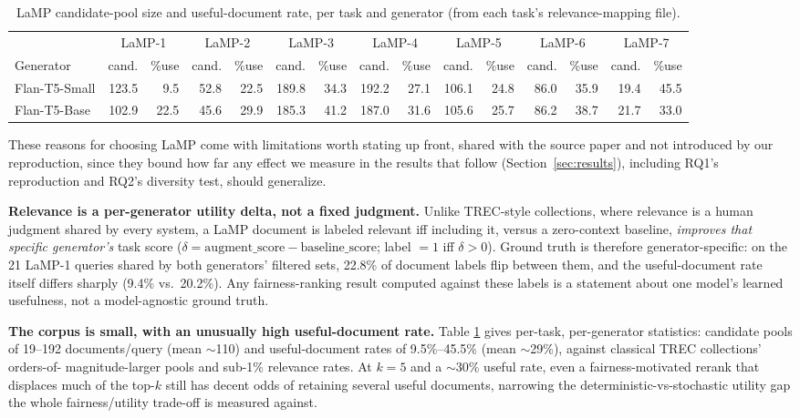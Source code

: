 \documentclass[10pt,twocolumn]{article}
\begin{document}
\begin{table}[t]
\centering
\scriptsize
\caption{LaMP candidate-pool size and useful-document rate, per task and generator (from each task's relevance-mapping file).}
\label{tab:corpus}
\begin{tabular}{@{}lrrrrrrrrrrrrrr@{}}
\toprule
& \multicolumn{2}{c}{LaMP-1} & \multicolumn{2}{c}{LaMP-2} & \multicolumn{2}{c}{LaMP-3} & \multicolumn{2}{c}{LaMP-4} & \multicolumn{2}{c}{LaMP-5} & \multicolumn{2}{c}{LaMP-6} & \multicolumn{2}{c}{LaMP-7} \\
Generator & cand. & \%use & cand. & \%use & cand. & \%use & cand. & \%use & cand. & \%use & cand. & \%use & cand. & \%use \\
\midrule
Flan-T5-Small & 123.5 & 9.5 & 52.8 & 22.5 & 189.8 & 34.3 & 192.2 & 27.1 & 106.1 & 24.8 & 86.0 & 35.9 & 19.4 & 45.5 \\
Flan-T5-Base  & 102.9 & 22.5 & 45.6 & 29.9 & 185.3 & 41.2 & 187.0 & 31.6 & 105.6 & 25.7 & 86.2 & 38.7 & 21.7 & 33.0 \\
\bottomrule
\end{tabular}
\end{table}

These reasons for choosing LaMP come with limitations worth stating up front, shared
with the source paper and not introduced by our reproduction, since they bound how
far any effect we measure in the results that follow (Section~\ref{sec:results}),
including RQ1's reproduction and RQ2's diversity test, should generalize.

\textbf{Relevance is a per-generator utility delta, not a fixed judgment.} Unlike
TREC-style collections, where relevance is a human judgment shared by every system, a
LaMP document is labeled relevant iff including it, versus a zero-context baseline,
\emph{improves that specific generator's} task score
($\delta = \text{augment\_score} - \text{baseline\_score}$; label $=1$ iff
$\delta{>}0$). Ground truth is therefore generator-specific: on the 21 LaMP-1 queries
shared by both generators' filtered sets, 22.8\% of document labels flip between
them, and the useful-document rate itself differs sharply (9.4\% vs.\ 20.2\%). Any
fairness-ranking result computed against these labels is a statement about one
model's learned usefulness, not a model-agnostic ground truth.

\textbf{The corpus is small, with an unusually high useful-document rate.} Table
\ref{tab:corpus} gives per-task, per-generator statistics: candidate pools of
19--192 documents/query (mean $\sim$110) and useful-document rates of
9.5\%--45.5\% (mean $\sim$29\%), against classical TREC collections' orders-of-
magnitude-larger pools and sub-1\% relevance rates. At $k{=}5$
\cite{eunkim2025fairrag} and a $\sim$30\% useful rate, even a fairness-motivated
rerank that displaces much of the top-$k$ still has decent odds of retaining several
useful documents, narrowing the deterministic-vs-stochastic utility gap the whole
fairness/utility trade-off is measured against.
\end{document}
